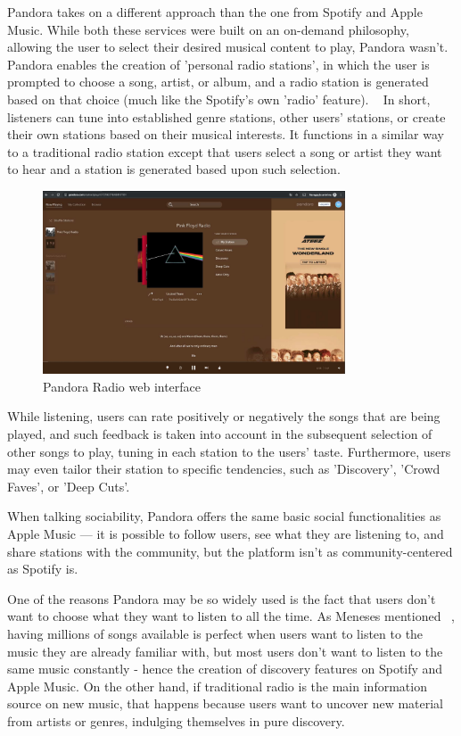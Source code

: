 Pandora takes on a different approach than the one from Spotify and Apple Music. While both these services were built on an on-demand philosophy, allowing the user to select their desired musical content to play, Pandora wasn't. Pandora enables the creation of 'personal radio stations', in which the user is prompted to choose a song, artist, or album, and a radio station is generated based on that choice (much like the Spotify's own 'radio' feature). ~\cite{Meneses2012} In short, listeners can tune into established genre stations, other users' stations, or create their own stations based on their musical interests. It functions in a similar way to a traditional radio station except that users select a song or artist they want to hear and a station is generated based upon such selection. ~\cite{Swanson2013}

\begin{figure}[h]
\centering
\includegraphics[width=0.8\textwidth]{./Images/pandora.png}
\caption{Pandora Radio web interface}
\label{fig:test_env}
\end{figure}

While listening, users can rate positively or negatively the songs that are being played, and such feedback is taken into account in the subsequent selection of other songs to play, tuning in each station to the users' taste. Furthermore, users may even tailor their station to specific tendencies, such as 'Discovery', 'Crowd Faves', or 'Deep Cuts'.

When talking sociability, Pandora offers the same basic social functionalities as Apple Music — it is possible to follow users, see what they are listening to, and share stations with the community, but the platform isn't as community-centered as Spotify is.

One of the reasons Pandora may be so widely used is the fact that users don't want to choose what they want to listen to all the time. As Meneses mentioned ~\cite{Meneses2012}, having millions of songs available is perfect when users want to listen to the music they are already familiar with, but most users don't want to listen to the same music constantly - hence the creation of discovery features on Spotify and Apple Music. On the other hand, if traditional radio is the main information source on new music, that happens because users want to uncover new material from artists or genres, indulging themselves in pure discovery.

